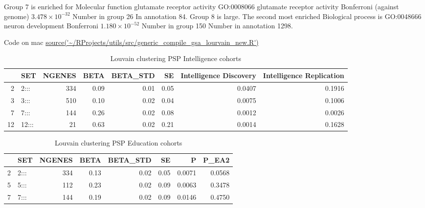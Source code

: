 Group 7 is enriched for Molecular function glutamate receptor activity GO:0008066 	glutamate receptor activity 		 	Bonferroni (against genome) $3.478 \times 10^{-32}$ 	Number in group 26  In annotation	84. 
Group 8 is large. The second most enriched Biological process is GO:0048666 	neuron development 		Bonferroni	$1.180 \times 10^{-52}$ 	Number in group 150 	Number in annotation 1298.

Code on mac \url{source('~/RProjects/utils/src/generic_compile_gsa_lourvain_new.R')}
\begin{table}[ht]
\centering
\begin{tabular}{rlrrrrrr}
  \hline
 & SET & NGENES & BETA & BETA\_STD & SE & Intelligence Discovery & Intelligence Replication \\ 
  \hline
2 & 2::: & 334 & 0.09 & 0.01 & 0.05 & 0.0407 & 0.1916 \\ 
  3 & 3::: & 510 & 0.10 & 0.02 & 0.04 & 0.0075 & 0.1006 \\ 
  7 & 7::: & 144 & 0.26 & 0.02 & 0.08 & 0.0012 & 0.0026 \\ 
  12 & 12::: & 21 & 0.63 & 0.02 & 0.21 & 0.0014 & 0.1628 \\ 
   \hline
\end{tabular}
\caption{Louvain clustering PSP Intelligence cohorts}
\label{tab:Louvain clustering intelligence}
\end{table}


\begin{table}[ht]
\centering
\begin{tabular}{rlrrrrrr}
  \hline
 & SET & NGENES & BETA & BETA\_STD & SE & P & P\_EA2 \\ 
  \hline
2 & 2::: & 334 & 0.13 & 0.02 & 0.05 & 0.0071 & 0.0568 \\ 
  5 & 5::: & 112 & 0.23 & 0.02 & 0.09 & 0.0063 & 0.3478 \\ 
  7 & 7::: & 144 & 0.19 & 0.02 & 0.09 & 0.0146 & 0.4750 \\ 
   \hline
\end{tabular}
\caption{Louvain clustering PSP Education cohorts}
\label{tab:Louvain clustering education}
\end{table}

